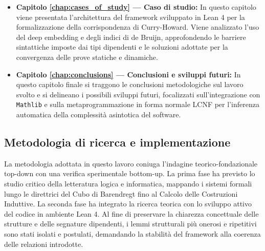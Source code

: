 \begin{itemize}
    \item \textbf{Capitolo \ref{chap:cases_of_study} --- Caso di studio:} 
        In questo capitolo viene presentata l'architettura del framework sviluppato in Lean 4 per la formalizzazione della corrispondenza di Curry-Howard. 
        Viene analizzato l'uso del deep embedding e degli indici di de Bruijn, approfondendo le barriere sintattiche imposte dai tipi dipendenti e le soluzioni 
        adottate per la convergenza delle prove statiche e dinamiche.
    
    \item \textbf{Capitolo \ref{chap:conclusions} --- Conclusioni e sviluppi futuri:} 
        In questo capitolo finale si traggono le conclusioni metodologiche sul lavoro svolto e si delineano i possibili sviluppi futuri, focalizzati sull'integrazione 
        con \texttt{Mathlib} e sulla metaprogrammazione in forma normale LCNF per l'inferenza automatica della complessità asintotica del software.
\end{itemize}

\subsection{Metodologia di ricerca e implementazione}
La metodologia adottata in questo lavoro coniuga l'indagine teorico-fondazionale top-down con una verifica sperimentale bottom-up. 
La prima fase ha previsto lo studio critico della letteratura logica e informatica, mappando i sistemi formali lungo le direttrici 
del Cubo di Barendregt fino al Calcolo delle Costruzioni Induttive. La seconda fase ha integrato la ricerca teorica con lo sviluppo 
attivo del codice in ambiente Lean 4. Al fine di preservare la chiarezza concettuale delle strutture e delle segnature dipendenti, 
i lemmi strutturali più onerosi e ripetitivi sono stati isolati e postulati, demandando la stabilità del framework alla coerenza 
delle relazioni introdotte.

\vfill
